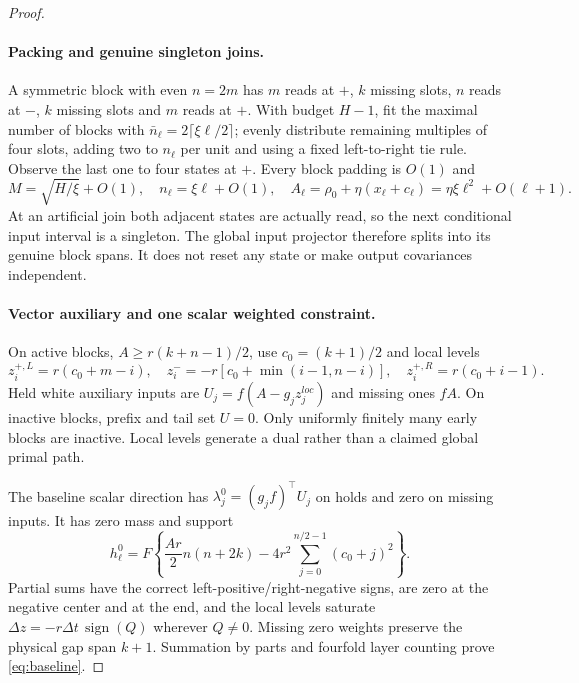 \documentclass[11pt]{article}
\begin{document}
\begin{proof}
\paragraph{Packing and genuine singleton joins.}
A symmetric block with even $n=2m$ has $m$ reads at $+$, $k$ missing slots,
$n$ reads at $-$, $k$ missing slots and $m$ reads at $+$.
With budget $H-1$, fit the maximal number of blocks with
$\bar n_\ell=2\lceil\xi\ell/2\rceil$; evenly distribute remaining multiples of
four slots, adding two to $n_\ell$ per unit and using a fixed left-to-right
tie rule. Observe the last one to four states at $+$.
Every block padding is $O(1)$ and
\[
M=\sqrt{H/\xi}+O(1),\quad n_\ell=\xi\ell+O(1),\quad
A_\ell=\rho_0+\eta(x_\ell+c_\ell)=\eta\xi\ell^2+O(\ell+1).
\]
At an artificial join both adjacent states are actually read, so the next
conditional input interval is a singleton.
The global input projector therefore splits into its genuine block spans.
It does not reset any state or make output covariances independent.

\paragraph{Vector auxiliary and one scalar weighted constraint.}
On active blocks, $A\ge r(k+n-1)/2$, use $c_0=(k+1)/2$ and local levels
\[
z_i^{+,L}=r(c_0+m-i),\quad
z_i^-=-r[c_0+\min(i-1,n-i)],\quad
z_i^{+,R}=r(c_0+i-1).
\]
Held white auxiliary inputs are $U_j=f(A-g_jz_j^{loc})$ and missing ones $fA$.
On inactive blocks, prefix and tail set $U=0$.
Only uniformly finitely many early blocks are inactive.
Local levels generate a dual rather than a claimed global primal path.

The baseline scalar direction has $\lambda_j^0=(g_jf)^\top U_j$ on holds
and zero on missing inputs. It has zero mass and support
\begin{equation}\label{eq:baseline}
h_\ell^0=F\left\{\frac{Ar}{2}n(n+2k)
-4r^2\sum_{j=0}^{n/2-1}(c_0+j)^2\right\}.
\end{equation}
Partial sums have the correct left-positive/right-negative signs,
are zero at the negative center and at the end, and the local levels
saturate $\Delta z=-r\Delta t\,\operatorname{sign}(Q)$ wherever $Q\ne0$.
Missing zero weights preserve the physical gap span $k+1$.
Summation by parts and fourfold layer counting prove \eqref{eq:baseline}.


\end{proof}
\end{document}
